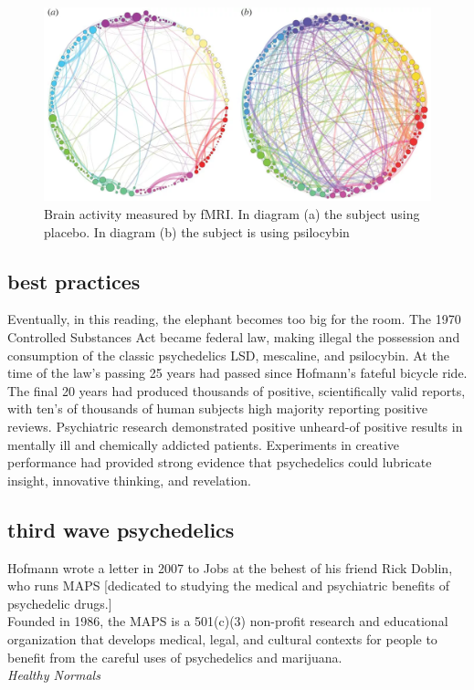 \documentclass{UIdahoMastersThesis}
\begin{document}
\begin{figure}[h!]
	\centering
	\includegraphics[width=\linewidth]{dmn.png}
	\caption{Brain activity measured by fMRI. In diagram (a) the subject using placebo. In diagram (b) the subject is using psilocybin}
	\label{fig:dmn}
\end{figure}

\subsection{best practices}

Eventually, in this reading, the elephant becomes too big for the room. The 1970 Controlled Substances Act became federal law, making illegal the possession and consumption of the classic psychedelics LSD, mescaline, and psilocybin. At the time of the law's passing 25 years had passed since Hofmann's fateful bicycle ride. The final 20 years had produced thousands of positive, scientifically valid reports, with ten's of thousands of human subjects high majority reporting positive reviews. Psychiatric research demonstrated positive unheard-of positive results in mentally ill and chemically addicted patients. Experiments in creative performance had provided strong evidence that psychedelics could lubricate insight, innovative thinking, and revelation.  

\subsection{third wave psychedelics}

\begin{snugshade*}
{Hofmann wrote a letter in 2007 to Jobs at the behest of his friend Rick Doblin, who runs MAPS [dedicated to studying the medical and psychiatric benefits of psychedelic drugs.]\\
Founded in 1986, the \ac{MAPS} is a 501(c)(3) non-profit research and educational organization that develops medical, legal, and cultural contexts for people to benefit from the careful uses of psychedelics and marijuana.}\\
\emph{Healthy Normals}
\end{snugshade*}
\end{document}
